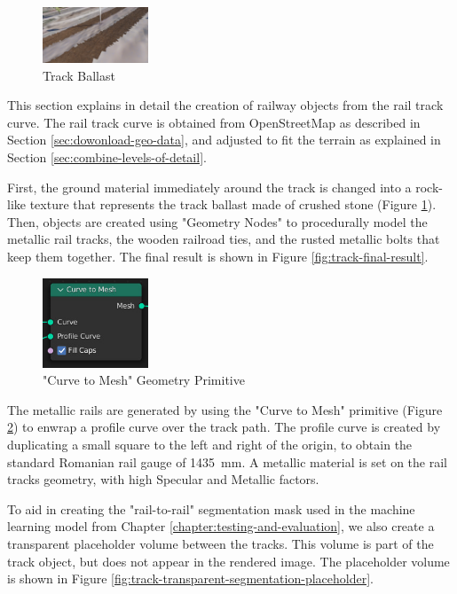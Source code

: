\begin{figure}
    \centering
    \includegraphics[width=0.28\textwidth]{src/img/procedural-tracks/1-trackbed.jpg}
    \caption{Track Ballast}
    \label{fig:track-ballast-pic}
\end{figure}

This section explains in detail the creation of railway objects from the rail track curve. The rail track curve is obtained from OpenStreetMap as described in Section \ref{sec:dowonload-geo-data}, and adjusted to fit the terrain as explained in Section \ref{sec:combine-levels-of-detail}.

First, the ground material immediately around the track is changed into a rock-like texture that represents the track ballast made of crushed stone (Figure \ref{fig:track-ballast-pic}). Then, objects are created using "Geometry Nodes" to procedurally model the metallic rail tracks, the wooden railroad ties, and the rusted metallic bolts that keep them together. The final result is shown in Figure \ref{fig:track-final-result}.

\begin{figure}
    \centering
    \includegraphics[width=0.28\textwidth]{src/img/procedural-tracks/3a-rails-curve-to-mesh.jpg}
    \caption{"Curve to Mesh" Geometry Primitive}
    \label{fig:track-curve-to-mesh-primitive}
\end{figure}


The metallic rails are generated by using the "Curve to Mesh" primitive (Figure \ref{fig:track-curve-to-mesh-primitive}) to enwrap a profile curve over the track path. The profile curve is created by duplicating a small square to the left and right of the origin, to obtain the standard Romanian rail gauge of 1435 mm. A metallic material is set on the rail tracks geometry, with high Specular and Metallic factors.

To aid in creating the "rail-to-rail" segmentation mask used in the machine learning model from Chapter \ref{chapter:testing-and-evaluation}, we also create a transparent placeholder volume between the tracks. This volume is part of the track object, but does not appear in the rendered image. The placeholder volume is shown in Figure \ref{fig:track-transparent-segmentation-placeholder}.

